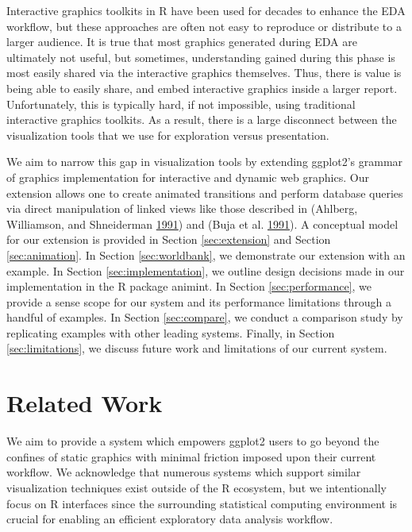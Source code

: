 \documentclass[12pt,]{isuthesis}
\begin{document}
Interactive graphics toolkits in R have been used for decades to enhance
the EDA workflow, but these approaches are often not easy to reproduce
or distribute to a larger audience. It is true that most graphics
generated during EDA are ultimately not useful, but sometimes,
understanding gained during this phase is most easily shared via the
interactive graphics themselves. Thus, there is value is being able to
easily share, and embed interactive graphics inside a larger report.
Unfortunately, this is typically hard, if not impossible, using
traditional interactive graphics toolkits. As a result, there is a large
disconnect between the visualization tools that we use for exploration
versus presentation.

We aim to narrow this gap in visualization tools by extending ggplot2's
grammar of graphics implementation for interactive and dynamic web
graphics. Our extension allows one to create animated transitions and
perform database queries via direct manipulation of linked views like
those described in (Ahlberg, Williamson, and Shneiderman
\protect\hyperlink{ref-Ahlberg:1991}{1991}) and (Buja et al.
\protect\hyperlink{ref-Buja:1991vh}{1991}). A conceptual model for our
extension is provided in Section \ref{sec:extension} and Section
\ref{sec:animation}. In Section \ref{sec:worldbank}, we demonstrate our
extension with an example. In Section \ref{sec:implementation}, we
outline design decisions made in our implementation in the R package
animint. In Section \ref{sec:performance}, we provide a sense scope for
our system and its performance limitations through a handful of
examples. In Section \ref{sec:compare}, we conduct a comparison study by
replicating examples with other leading systems. Finally, in Section
\ref{sec:limitations}, we discuss future work and limitations of our
current system.

\section{Related Work}

We aim to provide a system which empowers ggplot2 users to go beyond the
confines of static graphics with minimal friction imposed upon their
current workflow. We acknowledge that numerous systems which support
similar visualization techniques exist outside of the R ecosystem, but
we intentionally focus on R interfaces since the surrounding statistical
computing environment is crucial for enabling an efficient exploratory
data analysis workflow.
\end{document}
